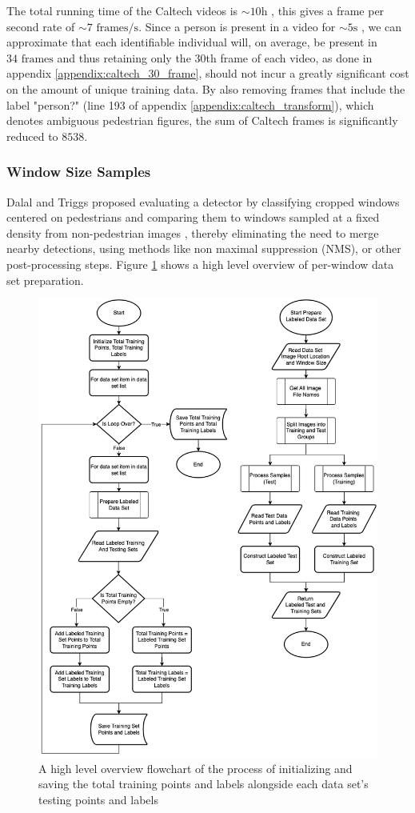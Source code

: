 The total running time of the Caltech videos is $\sim 10\mathrm{h}$ \cite{dollar_2009_pedestrian}, this gives a frame per second rate of $\sim 7 \text{ frames}/\mathrm{s}$. Since a person is present in a video for $\sim 5 \mathrm{s}$ \cite{dollar_2009_pedestrian}, we can approximate that each identifiable individual will, on average, be present in $34 \text{ frames}$ and thus retaining only the $30$th frame of each video, as done in appendix \ref{appendix:caltech_30_frame}, should not incur a greatly significant cost on the amount of unique training data. By also removing frames that include the label "person?" (line 193 of appendix \ref{appendix:caltech_transform}), which denotes ambiguous pedestrian figures, the sum of Caltech frames is significantly reduced to $8538$.

\subsubsection{Window Size Samples}

Dalal and Triggs proposed evaluating a detector by classifying cropped windows centered on pedestrians and comparing them to windows sampled at a fixed density from non-pedestrian images \cite{dalal_2005_histograms}, thereby eliminating the need to merge nearby detections, using methods like non maximal suppression (NMS), or other post-processing steps. Figure \ref{fig:dataset_high} shows a high level overview of per-window data set preparation.

\begin{figure}
    \centering
    \includegraphics[width=0.75\linewidth]{images/ee_dataset_high.drawio.png}
    \caption{A high level overview flowchart of the process of initializing and saving the total training points and labels alongside each data set's testing points and labels}
    \label{fig:dataset_high}
\end{figure}


